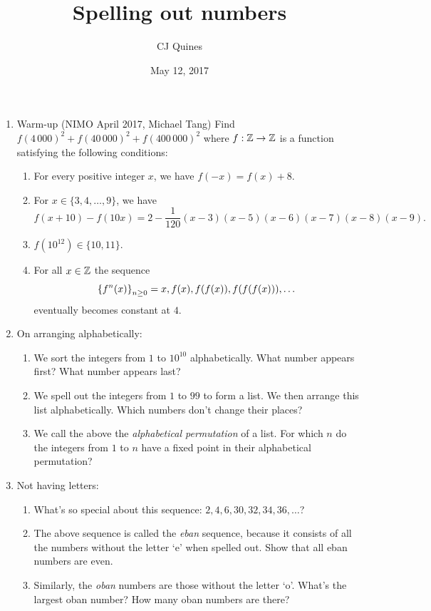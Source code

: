 \documentclass[11pt,paper=letter]{scrartcl}
\begin{document}
\title{Spelling out numbers}
\author{CJ Quines}
\date{May 12, 2017}

\maketitle

\begin{enumerate}
  \item Warm-up (NIMO April 2017, Michael Tang) Find $f(4\,000)^2 + f(40\,000)^2 + f(400\,000)^2$ where $f : \mathbb Z \rightarrow \mathbb Z$ is a function satisfying the following conditions:
  \begin{enumerate}
    \item For every positive integer $x$, we have $f(-x) = f(x) + 8$.
    \item For $x \in \{3, 4, \ldots, 9\}$, we have $$f(x+10) - f(10x) = 2 - \frac1{120}(x-3)(x-5)(x-6)(x-7)(x-8)(x-9).$$
    \item $f(10^{12}) \in \{10, 11\}.$
    \item For all $x \in \mathbb Z$ the sequence $$\left\{ f^n(x) \right\}_{n \geq 0} = x, f(x), f(f(x)), f(f(f(x))), \ldots$$ eventually becomes constant at $4$.
  \end{enumerate}
  \item On arranging alphabetically:
  \begin{enumerate}
    \item We sort the integers from $1$ to $10^{10}$ alphabetically. What number appears first? What number appears last?
    \item We spell out the integers from $1$ to $99$ to form a list. We then arrange this list alphabetically. Which numbers don't change their places? 
    \item We call the above the \emph{alphabetical permutation} of a list. For which $n$ do the integers from $1$ to $n$ have a fixed point in their alphabetical permutation?
  \end{enumerate}
  \item Not having letters:
  \begin{enumerate}
    \item What's so special about this sequence: $2, 4, 6, 30, 32, 34, 36, \ldots$?
    \item The above sequence is called the \emph{eban} sequence, because it consists of all the numbers without the letter `e' when spelled out. Show that all eban numbers are even.
    \item Similarly, the \emph{oban} numbers are those without the letter `o'. What's the largest oban number? How many oban numbers are there?

\end{enumerate}
\end{enumerate}
\end{document}
